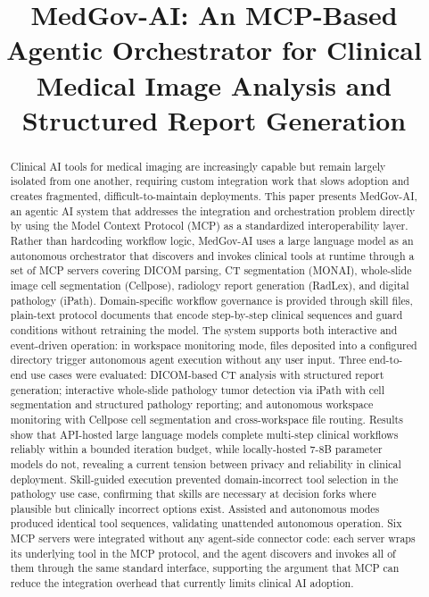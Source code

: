 \documentclass[conference]{IEEEtran}
\title{MedGov-AI: An MCP-Based Agentic Orchestrator for Clinical Medical Image Analysis and Structured Report Generation}
\begin{document}
\maketitle

\begin{abstract}
Clinical AI tools for medical imaging are increasingly capable but remain largely isolated from one another, requiring custom integration work that slows adoption and creates fragmented, difficult-to-maintain deployments. This paper presents MedGov-AI, an agentic AI system that addresses the integration and orchestration problem directly by using the Model Context Protocol (MCP) as a standardized interoperability layer. Rather than hardcoding workflow logic, MedGov-AI uses a large language model as an autonomous orchestrator that discovers and invokes clinical tools at runtime through a set of MCP servers covering DICOM parsing, CT segmentation (MONAI), whole-slide image cell segmentation (Cellpose), radiology report generation (RadLex), and digital pathology (iPath). Domain-specific workflow governance is provided through skill files, plain-text protocol documents that encode step-by-step clinical sequences and guard conditions without retraining the model. The system supports both interactive and event-driven operation: in workspace monitoring mode, files deposited into a configured directory trigger autonomous agent execution without any user input. Three end-to-end use cases were evaluated: DICOM-based CT analysis with structured report generation; interactive whole-slide pathology tumor detection via iPath with cell segmentation and structured pathology reporting; and autonomous workspace monitoring with Cellpose cell segmentation and cross-workspace file routing. Results show that API-hosted large language models complete multi-step clinical workflows reliably within a bounded iteration budget, while locally-hosted 7-8B parameter models do not, revealing a current tension between privacy and reliability in clinical deployment. Skill-guided execution prevented domain-incorrect tool selection in the pathology use case, confirming that skills are necessary at decision forks where plausible but clinically incorrect options exist. Assisted and autonomous modes produced identical tool sequences, validating unattended autonomous operation. Six MCP servers were integrated without any agent-side connector code: each server wraps its underlying tool in the MCP protocol, and the agent discovers and invokes all of them through the same standard interface, supporting the argument that MCP can reduce the integration overhead that currently limits clinical AI adoption.
\end{abstract}
\end{document}

